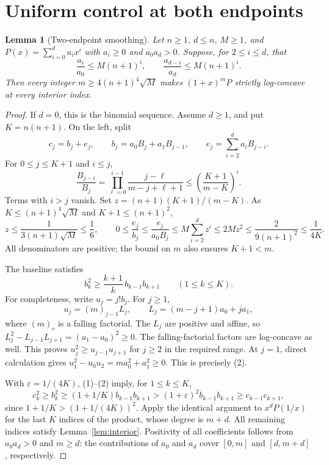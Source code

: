\documentclass[11pt]{article}
\newtheorem{lemma}[theorem]{Lemma}
\begin{document}
\section{Uniform control at both endpoints}
\begin{lemma}[Two-endpoint smoothing]\label{lem:polynomial}
Let $n\ge1$, $d\le n$, $M\ge1$, and
$P(x)=\sum_{i=0}^{d}a_ix^i$ with $a_i\ge0$ and $a_0a_d>0$.
Suppose, for $2\le i\le d$, that
\[
 \frac{a_i}{a_0}\le M(n+1)^i,
 \qquad
 \frac{a_{d-i}}{a_d}\le M(n+1)^i.
\]
Then every integer $m\ge4(n+1)^4\sqrt M$ makes $(1+x)^mP$ strictly
log-concave at every interior index.
\end{lemma}
\begin{proof}
If $d=0$, this is the binomial sequence. Assume $d\ge1$, and put
$K=n(n+1)$. On the left, split
\[
 c_j=b_j+e_j,\qquad
 b_j=a_0B_j+a_1B_{j-1},\qquad
 e_j=\sum_{i=2}^{d}a_iB_{j-i}.
\]
For $0\le j\le K+1$ and $i\le j$,
\[
 \frac{B_{j-i}}{B_j}
 =\prod_{\ell=0}^{i-1}\frac{j-\ell}{m-j+\ell+1}
 \le\left(\frac{K+1}{m-K}\right)^i.
\]
Terms with $i>j$ vanish. Set $z=(n+1)(K+1)/(m-K)$.
As $K\le(n+1)^4\sqrt M$ and $K+1\le(n+1)^2$,
\[
 z\le\frac{1}{3(n+1)\sqrt M}\le\frac16,
 \qquad
 0\le\frac{e_j}{b_j}\le\frac{e_j}{a_0B_j}
 \le M\sum_{i=2}^{d}z^i\le2Mz^2
 \le\frac{2}{9(n+1)^2}\le\frac{1}{4K}.
\tag{1}
\]
All denominators are positive; the bound on $m$ also ensures $K+1<m$.

The baseline satisfies
\[
 b_k^2\ge\frac{k+1}{k}\,b_{k-1}b_{k+1}\qquad(1\le k\le K).
\tag{2}
\]
For completeness, write $u_j=j!b_j$. For $j\ge1$,
\[
 u_j=(m)_{j-1}L_j,\qquad
 L_j=(m-j+1)a_0+ja_1,
\]
where $(m)_r$ is a falling factorial. The $L_j$ are positive and affine,
so $L_j^2-L_{j-1}L_{j+1}=(a_1-a_0)^2\ge0$.
The falling-factorial factors are log-concave as well. This proves
$u_j^2\ge u_{j-1}u_{j+1}$ for $j\ge2$ in the required range.
At $j=1$, direct calculation gives $u_1^2-u_0u_2=ma_0^2+a_1^2\ge0$.
This is precisely (2).

With $\varepsilon=1/(4K)$, (1)--(2) imply, for $1\le k\le K$,
\[
 c_k^2\ge b_k^2\ge(1+1/K)b_{k-1}b_{k+1}
 >(1+\varepsilon)^2b_{k-1}b_{k+1}
 \ge c_{k-1}c_{k+1},
\]
since $1+1/K>(1+1/(4K))^2$.
Apply the identical argument to $x^dP(1/x)$ for the last $K$ indices
of the product, whose degree is $m+d$. All remaining indices satisfy
Lemma~\ref{lem:interior}. Positivity of all coefficients follows from
$a_0a_d>0$ and $m\ge d$: the contributions of $a_0$ and $a_d$ cover
$[0,m]$ and $[d,m+d]$, respectively.
\end{proof}
\end{document}
